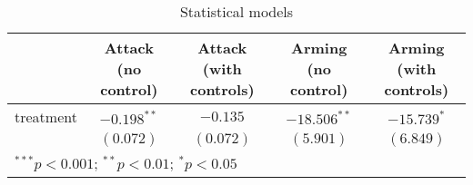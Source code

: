 
\begin{table}
\begin{center}
\begin{tabular}{l c c c c}
\hline
 & Attack (no control) & Attack (with controls) & Arming (no control) & Arming (with controls) \\
\hline
treatment & $-0.198^{**}$ & $-0.135$  & $-18.506^{**}$ & $-15.739^{*}$ \\
          & $(0.072)$     & $(0.072)$ & $(5.901)$      & $(6.849)$     \\
\hline
\multicolumn{5}{l}{\scriptsize{$^{***}p<0.001$; $^{**}p<0.01$; $^{*}p<0.05$}}
\end{tabular}
\caption{Statistical models}
\label{Table 2: Average Treatment Effects - Control Means}
\end{center}
\end{table}
